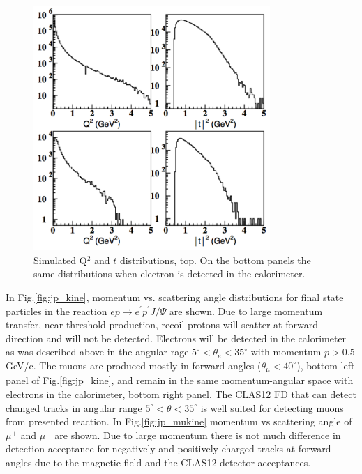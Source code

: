 \begin{figure}[htbp]
\begin{center}
\includegraphics[width=0.8\textwidth]{jpsi_q2_t_sim.pdf}
\caption{Simulated Q$^2$ and $t$ distributions, top. On the bottom panels the same distributions when electron is detected in the calorimeter.  }
\label{fig:jp_sim}
\end{center}
\end{figure}

In Fig.\ref{fig:jp_kine}, momentum vs. scattering angle distributions for final state particles in the reaction $ep\to e^\prime p^\prime J/\Psi$ are shown. Due to large momentum transfer, near threshold  production, recoil protons will scatter at forward direction and will not be detected. Electrons will be detected in the calorimeter as was described above in the angular rage $5^\circ < \theta_e <35^\circ$ with momentum $p>0.5$ GeV/c. The muons are produced mostly in forward angles ($\theta_\mu<40^\circ$), bottom left panel of Fig.\ref{fig:jp_kine}, and remain in the same momentum-angular space with electrons in the calorimeter, bottom right panel. The CLAS12 FD that can detect changed tracks in angular range $5^\circ < \theta <35^\circ$ is well suited for detecting muons from presented reaction. In Fig.\ref{fig:jp_mukine} momentum vs scattering angle of $\mu^+$ and $\mu^-$ are shown. Due to large momentum there is not much difference in detection acceptance for negatively and positively charged tracks at forward angles due to the magnetic field and the CLAS12 detector acceptances.

